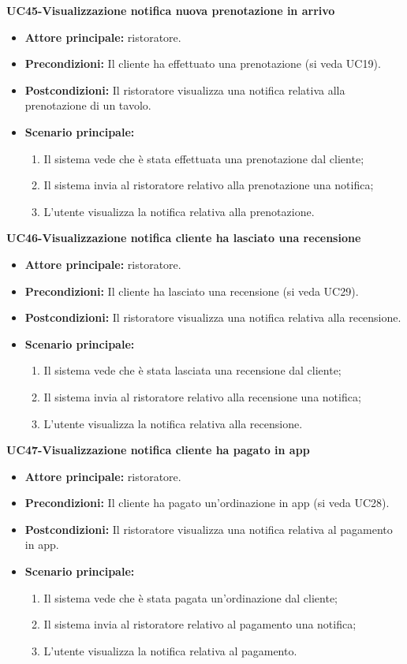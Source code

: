 \textbf{UC45-Visualizzazione notifica nuova prenotazione in arrivo}
\begin{itemize}
\item \textbf{Attore principale:} ristoratore.
\item \textbf{Precondizioni:} Il cliente ha effettuato una prenotazione (si veda UC19).
\item \textbf{Postcondizioni:} Il ristoratore visualizza una notifica relativa alla prenotazione di un tavolo.
\item \textbf{Scenario principale:}
\begin{enumerate}
    \item Il sistema vede che è stata effettuata una prenotazione dal cliente;
    \item Il sistema invia al ristoratore relativo alla prenotazione una notifica;
    \item L'utente visualizza la notifica relativa alla prenotazione.
\end{enumerate}
\end{itemize}

\textbf{UC46-Visualizzazione notifica cliente ha lasciato una recensione}
\begin{itemize}
\item \textbf{Attore principale:} ristoratore.
\item \textbf{Precondizioni:} Il cliente ha lasciato una recensione (si veda UC29).
\item \textbf{Postcondizioni:} Il ristoratore visualizza una notifica relativa alla recensione.
\item \textbf{Scenario principale:}
\begin{enumerate}
    \item Il sistema vede che è stata lasciata una recensione dal cliente;
    \item Il sistema invia al ristoratore relativo alla recensione una notifica;
    \item L'utente visualizza la notifica relativa alla recensione.
\end{enumerate}
\end{itemize}

\textbf{UC47-Visualizzazione notifica cliente ha pagato in app}
\begin{itemize}
\item \textbf{Attore principale:} ristoratore.
\item \textbf{Precondizioni:} Il cliente ha pagato un'ordinazione in app (si veda UC28).
\item \textbf{Postcondizioni:} Il ristoratore visualizza una notifica relativa al pagamento in app.
\item \textbf{Scenario principale:}
\begin{enumerate}
    \item Il sistema vede che è stata pagata un'ordinazione dal cliente;
    \item Il sistema invia al ristoratore relativo al pagamento una notifica;
    \item L'utente visualizza la notifica relativa al pagamento.
\end{enumerate}
\end{itemize}

